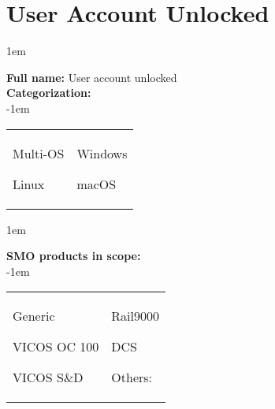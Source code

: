 
%
%

\section{User Account Unlocked}
\label{15018}

\openup 1em

\textbf{Full name:} User account unlocked\hrulefill \\
{\bf Categorization:} \\

\openup -1em
\vspace{-3em}

\begin{tabular}{p{}p{}}

\begin{todolist}
  	\item Multi-OS
	\item Linux
\end{todolist}
&
\begin{todolist}
	\item[\done] Windows
	\item macOS
\end{todolist}

\end{tabular}

\openup 1em

{\bf SMO products in scope:} \\

\openup -1em
\vspace{-3em}

\begin{tabular}{p{}p{}}

\begin{todolist}
  \item[\done] Generic
  \item VICOS OC 100
  \item VICOS S\&D
\end{todolist}
&
\begin{todolist}
  \item Rail9000
  \item DCS
  \item Others: \hrulefill
\end{todolist}

\end{tabular}

